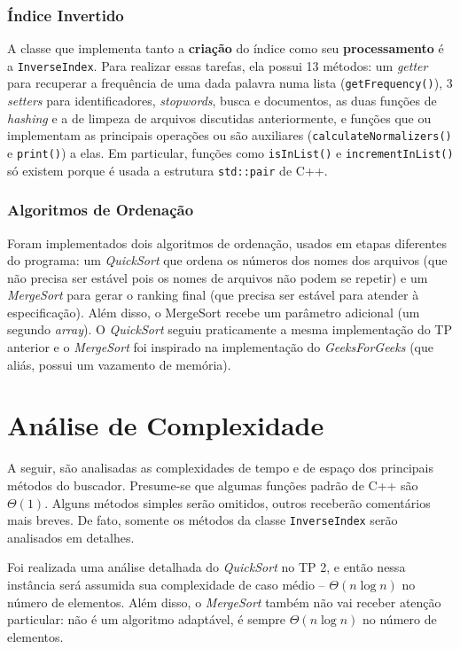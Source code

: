 \documentclass{article}
\def\code#1{\texttt{#1}}
\begin{document}
\subsubsection{Índice Invertido}

A classe que implementa tanto a \textbf{criação} do índice como seu \textbf{processamento} é a \code{InverseIndex}. Para realizar essas tarefas, ela possui 13 métodos: um \textit{getter} para recuperar a frequência de uma dada palavra numa lista (\code{getFrequency()}), 3 \textit{setters} para identificadores, \textit{stopwords}, busca e documentos, as duas funções de \textit{hashing} e a de limpeza de arquivos discutidas anteriormente, e funções que ou implementam as principais operações ou são auxiliares (\code{calculateNormalizers()} e \code{print()}) a elas. Em particular, funções como \code{isInList()} e \code{incrementInList()} só existem porque é usada a estrutura \code{std::pair} de C++.

\subsubsection{Algoritmos de Ordenação}

Foram implementados dois algoritmos de ordenação, usados em etapas diferentes do programa: um \textit{QuickSort} que ordena os números dos nomes dos arquivos (que não precisa ser estável pois os nomes de arquivos não podem se repetir) e um \textit{MergeSort} para gerar o ranking final (que precisa ser estável para atender à especificação). Além disso, o MergeSort recebe um parâmetro adicional (um segundo \textit{array}). O \textit{QuickSort} seguiu praticamente a mesma implementação do TP anterior e o \textit{MergeSort} foi inspirado na implementação do \textit{GeeksForGeeks} (que aliás, possui um vazamento de memória).

\section{Análise de Complexidade}

A seguir, são analisadas as complexidades de tempo e de espaço dos principais métodos do buscador. Presume-se que algumas funções padrão de C++ são \( \Theta(1) \). Alguns métodos simples serão omitidos, outros receberão comentários mais breves. De fato, somente os métodos da classe \code{InverseIndex} serão analisados em detalhes.

Foi realizada uma análise detalhada do \textit{QuickSort} no TP 2, e então nessa instância será assumida sua complexidade de caso médio -- \( \Theta(n \log n) \) no número de elementos. Além disso, o \textit{MergeSort} também não vai receber atenção particular: não é um algoritmo adaptável, é sempre \( \Theta(n \log n) \) no número de elementos.
\end{document}
